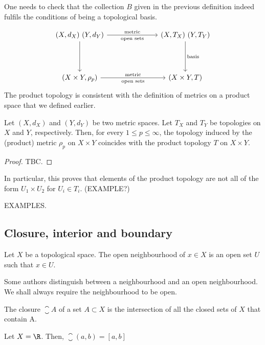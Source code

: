 \begin{remark}
  One needs to check that the collection $B$ given in the previous definition indeed fulfils the conditions of being a topological basis.
\end{remark}

\begin{equation*}
\begin{tikzcd}[column sep=25mm, row sep=15mm]
{(X,d_X)\ (Y,d_Y)} \arrow[r, "\text{metric}", "\text{open sets}" swap] \arrow[d] & {(X,T_X)\ (Y,T_Y)} \arrow[d, "\text{basis}"] \\
(X \times Y,\rho_p) \arrow[r, "\text{metric}", "\text{open sets}" swap] & (X \times Y,T)
\end{tikzcd}
\end{equation*}
The product topology is consistent with the definition of metrics on a product space that we defined earlier.

\begin{nthm}
  Let $(X,d_X)$ and $(Y,d_Y)$ be two metric spaces. Let $T_X$ and $T_Y$ be topologies on $X$ and $Y$, respectively. Then, for every $1 \leq p \leq \infty$, the topology induced by the (product) metric $\rho_p$ on $X \times Y$ coincides with the product topology $T$ on $X \times Y$.
\end{nthm}
\begin{proof}
  TBC.
\end{proof}
In particular, this proves that elements of the product topology are not all of the form $U_1 \times U_2$ for $U_i \in T_i$. (EXAMPLE?)

EXAMPLES.

\subsection{Closure, interior and boundary}
\begin{ndfn}[Neighbourhood]
  Let $X$ be a topological space. The open neighbourhood of $x \in X$ is an open set $U$ such that $x \in U$.
\end{ndfn}
Some authors distinguish between a neighbourhood and an open neighbourhood. We shall always require the neighbourhood to be open.

\begin{ndfn}[Closure]
  The closure $\closure{A}$ of a set $A \subset X$ is the intersection of all the closed sets of $X$ that contain A.
\end{ndfn}

\begin{negg}
  Let $X=\R$. Then, $\closure{(a,b)} = [a,b]$
\end{negg}

